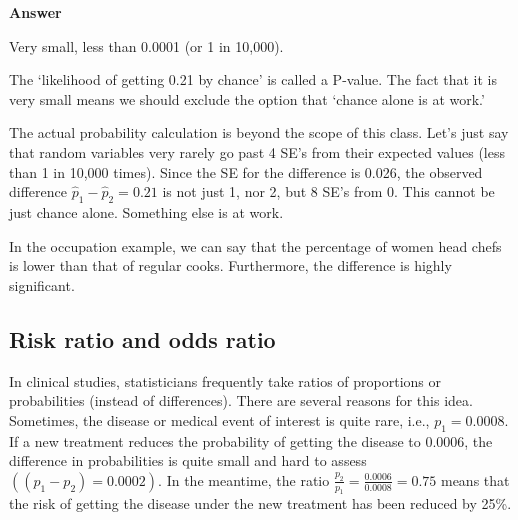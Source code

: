 \documentclass[11pt, chapterprefix=true]{scrbook}\usepackage[]{graphicx}\usepackage[]{color}
\begin{document}
\begin{minipage}[ht]{3cm}

\vspace{-3mm}

\textbf{Answer}
\end{minipage}
\begin{minipage}[ht]{12cm}

\parbox{12cm}{
Very small, less than 0.0001 (or 1 in 10,000).
}
\end{minipage}

The `likelihood of getting 0.21 by chance' is called a P-value. The fact that it is very small means we should exclude the option that `chance alone is at work.'

The actual probability calculation is beyond the scope of this class.  Let's just say that random variables very rarely go past 4 SE's from their expected values (less than 1 in 10,000 times).  Since the SE for the difference is 0.026, the observed difference $\hat{p}_1 - \hat{p}_2 = 0.21$  is not just 1, nor 2, but 8 SE's from 0.  This cannot be just chance alone.   Something else is at work.

\begin{center}
\end{center}

In the occupation example, we can say that the percentage of women head chefs
is lower than that of regular cooks.  Furthermore, the difference is highly significant.

\subsection{Risk ratio and odds ratio}   %

 In clinical studies, statisticians frequently take ratios of proportions or probabilities (instead of differences).  There are several reasons for this idea.  Sometimes, the disease or medical event of interest is quite rare, i.e., $p_1 = 0.0008$.  If a new treatment reduces the probability of getting the disease to 0.0006, the difference in probabilities is quite small and hard to assess $((p_1 - p_2) = 0.0002)$.  In the meantime, the ratio $ \frac{p_2}{p_1} = \frac{0.0006}{0.0008} = 0.75 $ means that the risk of getting the disease under the new treatment has been reduced by 25\%.
\end{document}
